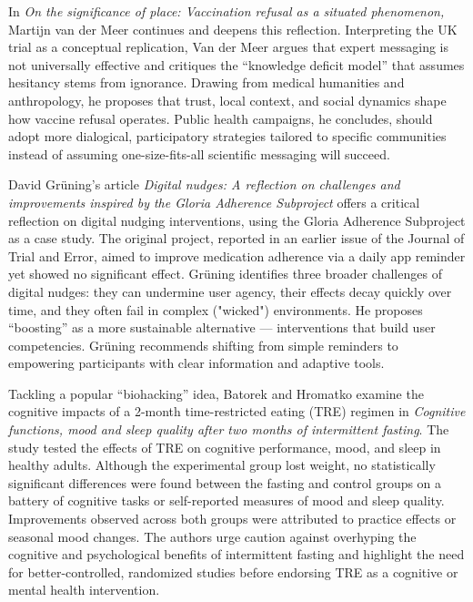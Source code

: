 \documentclass[authordate, empirical, issue]{jote-new-article}
\begin{document}
	In \emph{On the significance of place: Vaccination refusal as a situated phenomenon,} Martijn van der Meer continues and deepens this reflection. Interpreting the UK trial as a conceptual replication, Van der Meer argues that expert messaging is not universally effective and critiques the “knowledge deficit model” that assumes hesitancy stems from ignorance. Drawing from medical humanities and anthropology, he proposes that trust, local context, and social dynamics shape how vaccine refusal operates. Public health campaigns, he concludes, should adopt more dialogical, participatory strategies tailored to specific communities instead of assuming one-size-fits-all scientific messaging will succeed.



	David Grüning's article \emph{Digital nudges: A reflection on challenges and improvements inspired by the Gloria Adherence Subproject} offers a critical reflection on digital nudging interventions, using the Gloria Adherence Subproject as a case study. The original project, reported in an earlier issue of the Journal of Trial and Error, aimed to improve medication adherence via a daily app reminder yet showed no significant effect. Grüning identifies three broader challenges of digital nudges: they can undermine user agency, their effects decay quickly over time, and they often fail in complex ("wicked") environments. He proposes “boosting” as a more sustainable alternative — interventions that build user competencies. Grüning recommends shifting from simple reminders to empowering participants with clear information and adaptive tools.



	Tackling a popular “biohacking” idea, Batorek and Hromatko examine the cognitive impacts of a 2-month time-restricted eating (TRE) regimen in \emph{Cognitive functions, mood and sleep quality after two months of intermittent fasting}. The study tested the effects of TRE on cognitive performance, mood, and sleep in healthy adults. Although the experimental group lost weight, no statistically significant differences were found between the fasting and control groups on a battery of cognitive tasks or self-reported measures of mood and sleep quality. Improvements observed across both groups were attributed to practice effects or seasonal mood changes. The authors urge caution against overhyping the cognitive and psychological benefits of intermittent fasting and highlight the need for better-controlled, randomized studies before endorsing TRE as a cognitive or mental health intervention.
\end{document}
